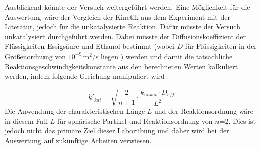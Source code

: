 \documentclass[12pt,liststotoc]{report}
\begin{document}
Ausblickend könnte der Versuch weitergeführt werden. Eine Möglichkeit für die Auswertung wäre der Vergleich der Kinetik aus dem Experiment mit der Literatur, jedoch für die unkatalysierte Reaktion. Dafür müsste der Versuch unkatalysiert durchgeführt werden. Dabei müsste der Diffusionskoeffizient der Flüssigkeiten Essigsäure und Ethanol bestimmt (wobei $D$ für Flüssigkeiten in der Größenordnung von $10^{-9}$\,$\text{m}^2/$s liegen \cite{mortimer2007chemie}) werden und damit die tatsächliche Reaktionsgeschwindigkeitskonstante aus den berechneten Werten kalkuliert werden, indem folgende Gleichung manipuliert wird \cite{Skript_2018}:

\begin{equation}
 k'_{kat} = \sqrt{\frac{2}{n +1} \cdot \frac{k_{unkat} \cdot D_{eff}}{L^2}}
\end{equation}
\noindent
Die Anwendung der charakteristischen Länge $L$ und der Reaktionsordnung wäre in diesem Fall $L$ für sphärische Partikel und Reaktionsordnung von $n$=2. Dies ist jedoch nicht das primäre Ziel dieser Laborübung und daher wird bei der Auswertung auf zukünftige Arbeiten verwiesen. 

\newpage
{}

\newpage
\setcounter{page}{2}

\newpage
\listoffigures

\newpage
\listoftables


\newpage

% 
%


\printbibliography








\end{document}
